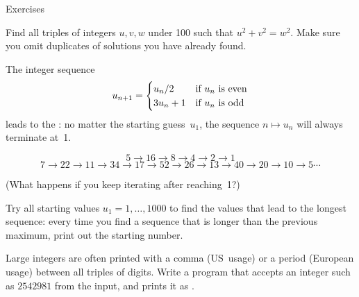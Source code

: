  {Exercises}

\begin{exercise}
  \label{ex:pythagoras}
  Find all triples of integers $u,v,w$ under 100 such that
  $u^2+v^2=w^2$. Make sure you omit duplicates of solutions you have
  already found.
\end{exercise}

\begin{exercise}
  \label{ex:collatz}
  The integer sequence
  \[ u_{n+1} = 
  \begin{cases}
    u_n/2&\hbox{if $u_n$ is even}\\
    3u_n+1&\hbox{if $u_n$ is odd}\\
  \end{cases}
  \]
  leads to the : no matter the starting guess~$u_1$,
  the sequence $n\mapsto u_n$ will always terminate at~1.

  { \small
  \[ 5\rightarrow 16\rightarrow 8\rightarrow 4\rightarrow 2\rightarrow 1\]
  \[ 7\rightarrow 22\rightarrow 11\rightarrow 34\rightarrow
  17\rightarrow 52\rightarrow 26\rightarrow 13\rightarrow
  40\rightarrow 20\rightarrow 10\rightarrow 5\cdots \]
  }

  (What happens if you keep iterating after reaching~1?)
  
  Try all starting values $u_1=1,\ldots,1000$ to find the values that
  lead to the longest sequence: every time you find a sequence that is
  longer than the previous maximum, print out the starting number.
\end{exercise}

\begin{exercise}
  \label{ex:mille-comma}
  Large integers are often printed with a comma (US~usage) or a period
  (European usage) between all triples of digits. Write a program that
  accepts an integer such as $2542981$ from the input, and prints it as
  .
\end{exercise}

\endinput

The web site
\url{http://www.codeforwin.in/2015/06/for-do-while-loop-programming-exercises.html}

\begin{comment}
  \begin{multicols}{2}
    \begin{lstlisting}
    \end{lstlisting}
    \columnbreak
    \begin{lstlisting}
    \end{lstlisting}
  \end{multicols}
  \begin{multicols}{2}
    \begin{lstlisting}
    \end{lstlisting}
    \columnbreak
    \begin{lstlisting}
    \end{lstlisting}
  \end{multicols}
\end{comment}
